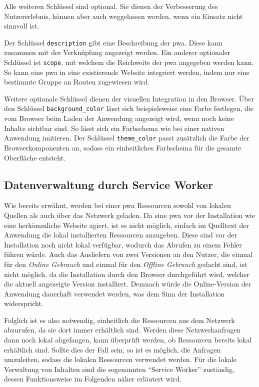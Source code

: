 \documentclass[12pt, parskip=half]{scrartcl}       %
\begin{document}
Alle weiteren Schlüssel sind optional.
Sie dienen der Verbesserung des Nutzererlebnis, können aber auch weggelassen werden, wenn ein Einsatz nicht sinnvoll ist.

Der Schlüssel \texttt{description} gibt eine Beschreibung der \ac{pwa}.
Diese kann zusammen mit der Verknüpfung angezeigt werden.
Ein anderer optionaler Schlüssel ist \texttt{scope}, mit welchem die Reichweite der \ac{pwa} angegeben werden kann.
So kann eine \ac{pwa} in eine existierende Website integriert werden, indem nur eine bestimmte Gruppe an Routen zugewiesen wird\cite{webdev_addmanifest}.

Weitere optionale Schlüssel dienen der visuellen Integration in den Browser.
Über den Schlüssel \texttt{background\_color} lässt sich beispielsweise eine Farbe festlegen, die vom Browser beim Laden der Anwendung angezeigt wird, wenn noch keine Inhalte sichtbar sind.
So lässt sich ein Farbschema wie bei einer nativen Anwendung imitieren.
Der Schlüssel \texttt{theme\_color} passt zusätzlich die Farbe der Browserkomponenten an, sodass ein einheitliches Farbschema für die gesamte Oberfläche entsteht.



\subsection{Datenverwaltung durch Service Worker}

Wie bereits erwähnt, werden bei einer \ac{pwa} Ressourcen sowohl von lokalen Quellen als auch über das Netzwerk geladen.
Da eine \ac{pwa} vor der Installation wie eine herkömmliche Website agiert, ist es nicht möglich, einfach im Quelltext der Anwendung die lokal installierten Ressourcen anzugeben.
Diese sind vor der Installation noch nicht lokal verfügbar, wodurch das Abrufen zu einem Fehler führen würde.
Auch das Ausliefern von zwei Versionen an den Nutzer, die einmal für den \textit{Online Gebrauch} und einmal für den \textit{Offline Gebrauch} gedacht sind, ist nicht möglich, da die Installation durch den Browser durchgeführt wird, welcher die aktuell angezeigte Version installiert.
Demnach würde die Online-Version der Anwendung dauerhaft verwendet werden, was dem Sinn der Installation widerspricht.

Folglich ist es also notwendig, einheitlich die Ressourcen aus dem Netzwerk abzurufen, da sie dort immer erhältlich sind.
Werden diese Netzwerkanfragen dann noch lokal abgefangen, kann überprüft werden, ob Ressourcen bereits lokal erhältlich sind.
Sollte dies der Fall sein, so ist es möglich, die Anfragen umzuleiten, sodass die lokalen Ressourcen verwendet werden.
Für die lokale Verwaltung von Inhalten sind die sogenannten \enquote{Service Worker} zuständig, dessen Funktionsweise im Folgenden näher erläutert wird.
\end{document}
